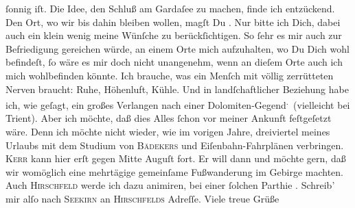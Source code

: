 \begin{ledgroupsized}[t]{13cm}
               ſonnig iſt. Die Idee, den Schluß am Gardaſee zu
               machen, finde ich entzückend. Den Ort, wo wir bis dahin bleiben wollen, magſt Du
                  \label{K_L03073-2v}\label{K_L03073-2h}. Nur bitte ich Dich, dabei auch ein klein wenig meine Wünſche zu
               berückſichtigen. So ſehr {\pb}es mir auch zur Befriedigung
               gereichen würde, an einem Orte mich aufzuhalten, wo Du Dich wohl befindeſt, ſo wäre
               es mir doch nicht \strikeout{\textcolor{gray}{×}} unangenehm, wenn an dieſem Orte auch ich mich wohlbefinden könnte. Ich
               brauche, was ein Menſch mit völlig zerrütteten Nerven braucht: Ruhe, Höhenluft,
               Kühle. Und in landſchaftlicher Beziehung habe ich, wie geſagt, ein großes  Verlangen nach einer Dolomiten-Gegend\substVorne{}\textsuperscript{.}\substDazwischen{} (\substHinten{}vielleicht bei Trient). Aber ich möchte,
               daß dies Alles ſchon vor meiner Ankunft {\pb}feſtgeſetzt
               wäre. Denn ich möchte nicht wieder, wie im vorigen Jahre,
               dreiviertel meines Urlaubs mit dem Studium von \textsc{Bädekers} und Eiſenbahn-Fahrplänen verbringen.\pend
           \pstart
           \textsc{Kerr} kann hier erſt gegen Mitte Auguſt fort. Er will
               dann \label{K_L03073-3v}\label{K_L03073-3h} und möchte gern, daß
               wir womöglich eine mehrtägige gemeinſame Fußwanderung im Gebirge machten. Auch \textsc{Hirschfeld}{ }{\pb}werde ich dazu animiren, bei einer ſolchen Parthie
                  \label{K_L03073-5v}\label{K_L03073-5h}.\pend
           \pstart
           Schreib’ mir alſo nach \textsc{Seekirn} an \textsc{Hirschfelds} Adreſſe. Viele treue Grüße

\end{ledgroupsized}

